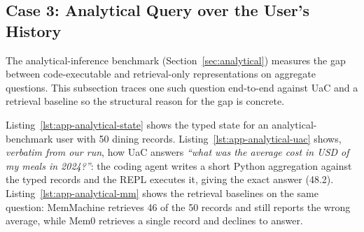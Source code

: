 \subsection{Case 3: Analytical Query over the User's History}

The analytical-inference benchmark (Section~\ref{sec:analytical}) measures the gap between code-executable and retrieval-only representations on aggregate questions. This subsection traces one such question end-to-end against UaC and a retrieval baseline so the structural reason for the gap is concrete.

Listing~\ref{lst:app-analytical-state} shows the typed state for an analytical-benchmark user with 50 dining records. Listing~\ref{lst:app-analytical-uac} shows, \emph{verbatim from our run}, how UaC answers \emph{``what was the average cost in USD of my meals in 2024?''}: the coding agent writes a short Python aggregation against the typed records and the REPL executes it, giving the exact answer (48.2). Listing~\ref{lst:app-analytical-mm} shows the retrieval baselines on the same question: MemMachine retrieves 46 of the 50 records and still reports the wrong average, while Mem0 retrieves a single record and declines to answer.

